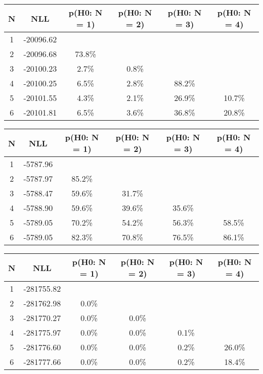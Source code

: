 \begin{table}[htb]
	\begin{center}
{\footnotesize\renewcommand{\arraystretch}{1.4}
		\begin{tabular}{cc||cccc}
			N & NLL & p(H0: N = 1) & p(H0: N = 2) & p(H0: N = 3) & p(H0: N = 4)\\ 
		\hline
1 & -20096.62 & & & & \\
2 & -20096.68 & 73.8\% & & & \\
3 & -20100.23 & 2.7\% & 0.8\% & & \\
4 & -20100.25 & 6.5\% & 2.8\% & 88.2\% & \\
5 & -20101.55 & 4.3\% & 2.1\% & 26.9\% & 10.7\% \\
6 & -20101.81 & 6.5\% & 3.6\% & 36.8\% & 20.8\% \\
	\end{tabular}
		\label{tab:lab}
	}
	\end{center}\end{table}

\begin{table}[htb]
	\begin{center}
{\footnotesize\renewcommand{\arraystretch}{1.4}
		\begin{tabular}{cc||cccc}
			N & NLL & p(H0: N = 1) & p(H0: N = 2) & p(H0: N = 3) & p(H0: N = 4)\\ 
		\hline
1 & -5787.96 & & & & \\
2 & -5787.97 & 85.2\% & & & \\
3 & -5788.47 & 59.6\% & 31.7\% & & \\
4 & -5788.90 & 59.6\% & 39.6\% & 35.6\% & \\
5 & -5789.05 & 70.2\% & 54.2\% & 56.3\% & 58.5\% \\
6 & -5789.05 & 82.3\% & 70.8\% & 76.5\% & 86.1\% \\
	\end{tabular}
		\label{tab:lab}
	}
	\end{center}\end{table}

\begin{table}[htb]
	\begin{center}
{\footnotesize\renewcommand{\arraystretch}{1.4}
		\begin{tabular}{cc||cccc}
			N & NLL & p(H0: N = 1) & p(H0: N = 2) & p(H0: N = 3) & p(H0: N = 4)\\ 
		\hline
1 & -281755.82 & & & & \\
2 & -281762.98 & 0.0\% & & & \\
3 & -281770.27 & 0.0\% & 0.0\% & & \\
4 & -281775.97 & 0.0\% & 0.0\% & 0.1\% & \\
5 & -281776.60 & 0.0\% & 0.0\% & 0.2\% & 26.0\% \\
6 & -281777.66 & 0.0\% & 0.0\% & 0.2\% & 18.4\% \\
	\end{tabular}
		\label{tab:lab}
	}
	\end{center}\end{table}

